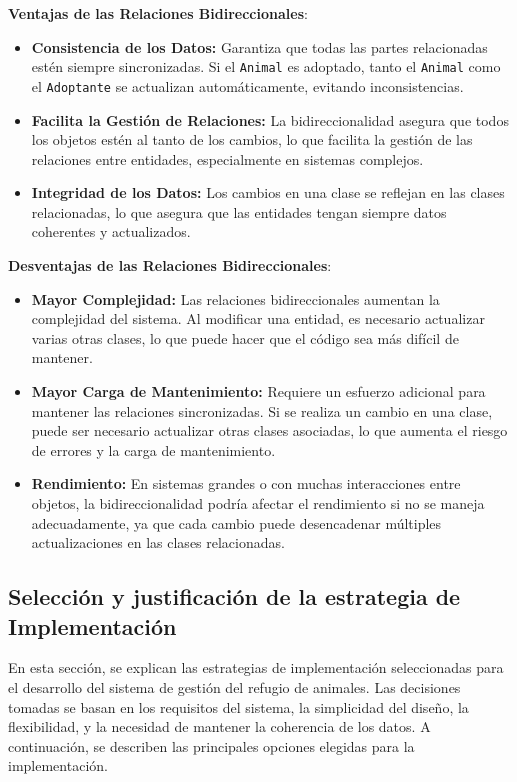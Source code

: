 \textbf{Ventajas de las Relaciones Bidireccionales}:
\begin{itemize}
    \item \textbf{Consistencia de los Datos:} Garantiza que todas las partes relacionadas estén siempre sincronizadas. Si el \texttt{Animal} es adoptado, tanto el \texttt{Animal} como el \texttt{Adoptante} se actualizan automáticamente, evitando inconsistencias.
    \item \textbf{Facilita la Gestión de Relaciones:} La bidireccionalidad asegura que todos los objetos estén al tanto de los cambios, lo que facilita la gestión de las relaciones entre entidades, especialmente en sistemas complejos.
    \item \textbf{Integridad de los Datos:} Los cambios en una clase se reflejan en las clases relacionadas, lo que asegura que las entidades tengan siempre datos coherentes y actualizados.
\end{itemize}

\textbf{Desventajas de las Relaciones Bidireccionales}:
\begin{itemize}
    \item \textbf{Mayor Complejidad:} Las relaciones bidireccionales aumentan la complejidad del sistema. Al modificar una entidad, es necesario actualizar varias otras clases, lo que puede hacer que el código sea más difícil de mantener.
    \item \textbf{Mayor Carga de Mantenimiento:} Requiere un esfuerzo adicional para mantener las relaciones sincronizadas. Si se realiza un cambio en una clase, puede ser necesario actualizar otras clases asociadas, lo que aumenta el riesgo de errores y la carga de mantenimiento.
    \item \textbf{Rendimiento:} En sistemas grandes o con muchas interacciones entre objetos, la bidireccionalidad podría afectar el rendimiento si no se maneja adecuadamente, ya que cada cambio puede desencadenar múltiples actualizaciones en las clases relacionadas.
\end{itemize}


\subsection{Selección y justificación de la estrategia de Implementación}

En esta sección, se explican las estrategias de implementación seleccionadas para el desarrollo del sistema de gestión del refugio de animales. Las decisiones tomadas se basan en los requisitos del sistema, la simplicidad del diseño, la flexibilidad, y la necesidad de mantener la coherencia de los datos. A continuación, se describen las principales opciones elegidas para la implementación.

